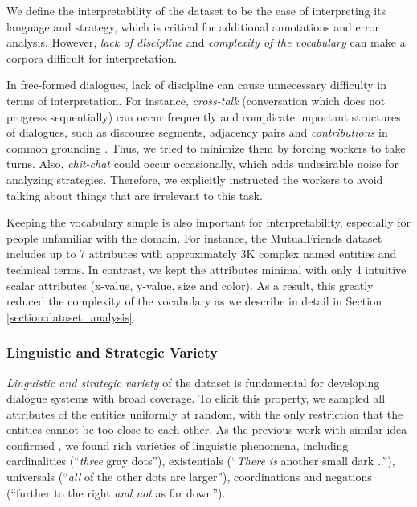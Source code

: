 \documentclass[letterpaper]{article} %
\newcommand{\utterance}[1]{``#1''}
\begin{document}
We define the interpretability of the dataset to be the ease of interpreting its language and strategy, which is critical for additional annotations and error analysis. However, \emph{lack of discipline} and \emph{complexity of the vocabulary} can make a corpora difficult for interpretation.

In free-formed dialogues, lack of discipline can cause unnecessary difficulty in terms of interpretation. For instance, \emph{cross-talk} (conversation which does not progress sequentially) can occur frequently \cite{he2017learning} and complicate important structures of dialogues, such as discourse segments, adjacency pairs and \emph{contributions} in common grounding \cite{clark1996using}. Thus, we tried to minimize them by forcing workers to take turns. Also, \emph{chit-chat} could occur occasionally, which adds undesirable noise for analyzing strategies. Therefore, we explicitly instructed the workers to avoid talking about things that are irrelevant to this task.

Keeping the vocabulary simple is also important for interpretability, especially for people unfamiliar with the domain. For instance, the MutualFriends dataset \cite{he2017learning} includes up to 7 attributes with approximately 3K complex named entities and technical terms. In contrast, we kept the attributes minimal with only 4 intuitive scalar attributes (x-value, y-value, size and color). As a result, this greatly reduced the complexity of the vocabulary as we describe in detail in Section \ref{section:dataset_analysis}.

\subsubsection{Linguistic and Strategic Variety}

\emph{Linguistic and strategic variety} of the dataset is fundamental for developing dialogue systems with broad coverage. To elicit this property, we sampled all attributes of the entities uniformly at random, with the only restriction that the entities cannot be too close to each other. As the previous work with similar idea confirmed \cite{suhr2017corpus}, we found rich varieties of linguistic phenomena, including cardinalities (\utterance{\textit{three} gray dots}), existentials (\utterance{\textit{There is} another small dark ..}), universals (\utterance{\textit{all} of the other dots are larger}), coordinations and negations (\utterance{further to the right \textit{and} \textit{not} as far down}).
\end{document}
